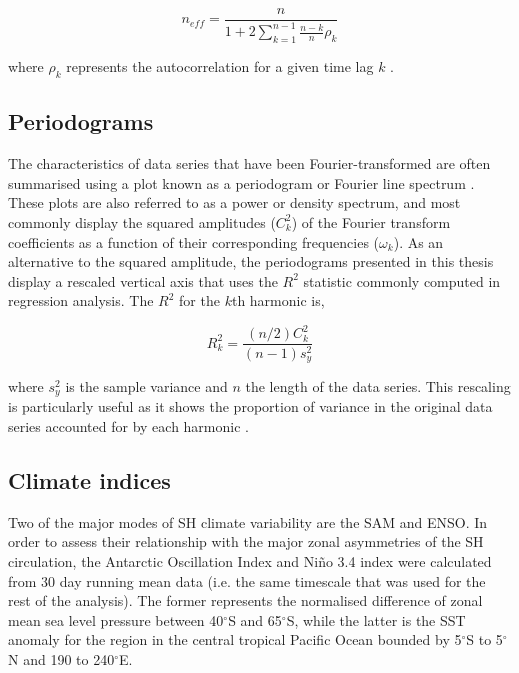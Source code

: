 \begin{equation}\label{eq:effective_sample_size}
n_{eff} = \frac{n}{1 + 2\displaystyle\sum_{k=1}^{n-1} \frac{n-k}{n}\rho_k}
\end{equation}

\noindent where $\rho_k$ represents the autocorrelation for a given time lag $k$ \citep{Zieba2010}.  

\subsection{Periodograms}
The characteristics of data series that have been Fourier-transformed are often summarised using a plot known as a periodogram or Fourier line spectrum \citep{Wilks2011}. These plots are also referred to as a power or density spectrum, and most commonly display the squared amplitudes ($C_k^2$) of the Fourier transform coefficients as a function of their corresponding frequencies ($\omega_k$). As an alternative to the squared amplitude, the periodograms presented in this thesis display a rescaled vertical axis that uses the $R^2$ statistic commonly computed in regression analysis. The $R^2$ for the $k$th harmonic is,

\begin{equation}\label{eq:variance_explained}
R_k^2 = \frac{(n/2)C_k^2}{(n-1)s_y^2}
\end{equation}

\noindent where $s_y^2$ is the sample variance and $n$ the length of the data series. This rescaling is particularly useful as it shows the proportion of variance in the original data series accounted for by each harmonic \citep{Wilks2011}.

\subsection{Climate indices}
Two of the major modes of SH climate variability are the SAM and ENSO. In order to assess their relationship with the major zonal asymmetries of the SH circulation, the Antarctic Oscillation Index \citep[AOI;][]{Gong1999} and Ni\~{n}o 3.4 index \citep{Trenberth2001} were calculated from 30 day running mean data (i.e. the same timescale that was used for the rest of the analysis). The former represents the normalised difference of zonal mean sea level pressure between 40$^{\circ}$S and 65$^{\circ}$S, while the latter is the SST anomaly for the region in the central tropical Pacific Ocean bounded by 5$^{\circ}$S to 5$^{\circ}$N and 190 to 240$^{\circ}$E. 


